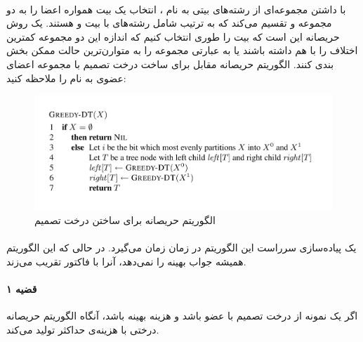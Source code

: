 \documentclass[a4paper]{article}
\begin{document}
	\paragraph{}
	با داشتن مجموعه‌ای از رشته‌های 
	بیتی به نام
	، انتخاب یک بیت
	همواره اعضا را به دو مجموعه 
	و 
	تقسیم می‌کند که به ترتیب شامل رشته‌های با بیت
	و
	هستند. یک روش حریصانه این است که بیت
	را طوری انتخاب کنیم که اندازه این دو مجموعه کمترین اختلاف را با هم داشته باشند یا به عبارتی مجموعه
	را به متوارن‌ترین حالت ممکن بخش بندی کنند. الگوریتم حریصانه مقابل برای ساخت درخت تصمیم با مجموعه اعضای 
	عضوی به نام
	را ملاحظه کنید:
	\begin{figure}[h!]
		\centering
		\includegraphics[width=0.7\linewidth]{Pics/Greedy.png}
		\caption{الگوریتم حریصانه برای ساختن درخت تصمیم}
	\end{figure}
	\paragraph{}
	یک پیاده‌سازی سرراست این الگوریتم در زمان 
	زمان می‌گیرد.
	در حالی که این الگوریتم همیشه جواب بهینه را نمی‌دهد، آنرا با فاکتور 
	تقریب می‌زند.
	\paragraph{قضیه ۱}
	اگر
	یک نمونه از درخت تصمیم با
	عضو باشد و هزینه بهینه
	باشد، آنگاه الگوریتم حریصانه درختی با هزینه‌ی حداکثر 
	تولید می‌کند.
\end{document}
